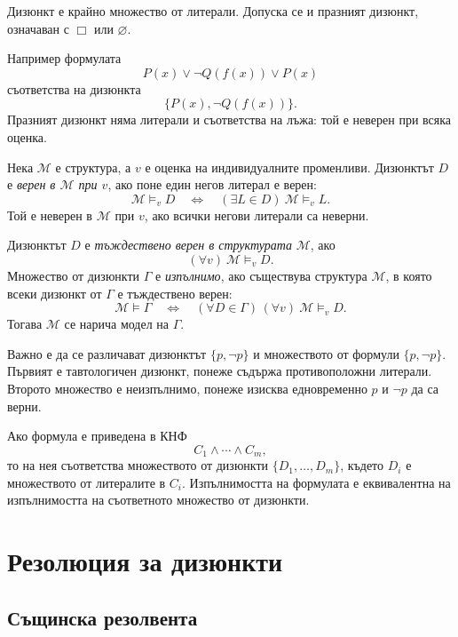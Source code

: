 \begin{defn}
Дизюнкт е крайно множество от литерали. Допуска се и празният дизюнкт, означаван с $\Box$ или $\varnothing$.
\end{defn}

Например формулата
\[
P(x)\vee\neg Q(f(x))\vee P(x)
\]
съответства на дизюнкта
\[
\{P(x),\neg Q(f(x))\}.
\]
Празният дизюнкт няма литерали и съответства на лъжа: той е неверен при всяка оценка.

\begin{defn}
Нека $\mathcal M$ е структура, а $v$ е оценка на индивидуалните променливи. Дизюнктът $D$ е \emph{верен в $\mathcal M$ при $v$}, ако поне един негов литерал е верен:
\[
\mathcal M\models_v D
\quad\Longleftrightarrow\quad
(\exists L\in D)\ \mathcal M\models_v L.
\]
Той е неверен в $\mathcal M$ при $v$, ако всички негови литерали са неверни.
\end{defn}

\begin{defn}
Дизюнктът $D$ е \emph{тъждествено верен в структурата} $\mathcal M$, ако
\[
(\forall v)\ \mathcal M\models_v D.
\]
Множество от дизюнкти $\Gamma$ е \emph{изпълнимо}, ако съществува структура $\mathcal M$, в която всеки дизюнкт от $\Gamma$ е тъждествено верен:
\[
\mathcal M\models\Gamma
\quad\Longleftrightarrow\quad
(\forall D\in\Gamma)\,(\forall v)\ \mathcal M\models_v D.
\]
Тогава $\mathcal M$ се нарича модел на $\Gamma$.
\end{defn}

Важно е да се различават дизюнктът $\{p,\neg p\}$ и множеството от формули $\{p,\neg p\}$. Първият е тавтологичен дизюнкт, понеже съдържа противоположни литерали. Второто множество е неизпълнимо, понеже изисква едновременно $p$ и $\neg p$ да са верни.

\begin{remark}
Ако формула е приведена в КНФ
\[
C_1\wedge\cdots\wedge C_m,
\]
то на нея съответства множеството от дизюнкти $\{D_1,\ldots,D_m\}$, където $D_i$ е множеството от литералите в $C_i$. Изпълнимостта на формулата е еквивалентна на изпълнимостта на съответното множество от дизюнкти.
\end{remark}

\section{Резолюция за дизюнкти}\label{s:22.2}

\subsection{Същинска резолвента}\label{s:22.2.1}

